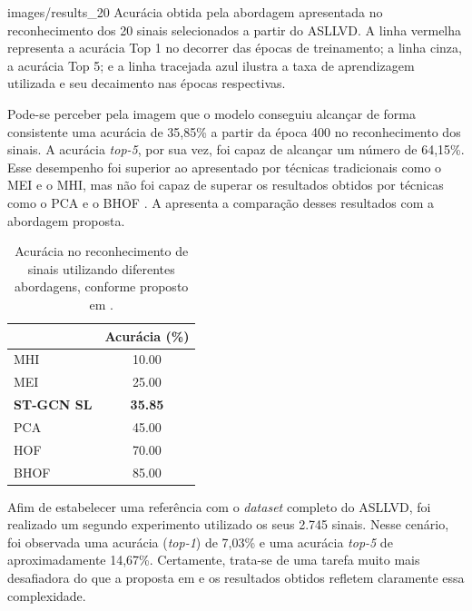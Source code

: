     {images/results_20}
    {Acurácia obtida pela abordagem apresentada no reconhecimento dos 20 sinais selecionados a partir do ASLLVD. A linha vermelha representa a acurácia Top 1 no decorrer das épocas de treinamento; a linha cinza, a acurácia Top 5; e a linha tracejada azul ilustra a taxa de aprendizagem utilizada e seu decaimento nas épocas respectivas.}

Pode-se perceber pela imagem que o modelo conseguiu alcançar de forma consistente uma acurácia de 35,85\% a partir da época 400 no reconhecimento dos sinais. A acurácia \textit{top-5}, por sua vez, foi capaz de alcançar um número de 64,15\%. Esse desempenho foi superior ao apresentado por técnicas tradicionais como o MEI e o MHI, mas não foi capaz de superar os resultados obtidos por técnicas como o PCA e o BHOF \cite{lim-2016}. A  apresenta a comparação desses resultados com a abordagem proposta.

\begin{table}[ht]
\centering
\caption{Acurácia no reconhecimento de sinais utilizando diferentes abordagens, conforme proposto em \cite{lim-2016}.}
\label{tab:results-comparison-20}
\begin{tabular}{lc}
\hline
                   & Acurácia (\%)  \\ \hline
MHI                & 10.00                     \\
MEI                & 25.00                     \\
\textbf{ST-GCN SL} & \textbf{35.85}            \\
PCA                & 45.00                     \\
HOF                & 70.00                     \\
BHOF               & 85.00                     \\ \hline
\end{tabular}
\end{table}



Afim de estabelecer uma referência com o \textit{dataset} completo do ASLLVD, foi realizado um segundo experimento utilizado os seus 2.745 sinais. Nesse cenário, foi observada uma acurácia (\textit{top-1}) de 7,03\% e uma acurácia \textit{top-5} de aproximadamente 14,67\%. Certamente, trata-se de uma tarefa muito mais desafiadora do que a proposta em \cite{lim-2016} e os resultados obtidos refletem claramente essa complexidade. 

